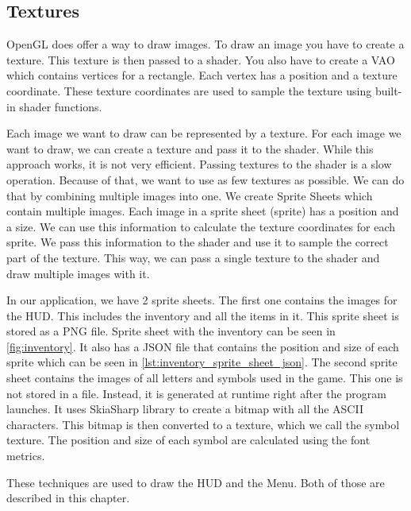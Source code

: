\subsection{Textures} \label{sec:textures}
OpenGL does offer a way to draw images.
To draw an image you have to create a texture.
This texture is then passed to a shader.
You also have to create a VAO which contains vertices for a rectangle.
Each vertex has a position and a texture coordinate.
These texture coordinates are used to sample the texture using built-in shader functions.

Each image we want to draw can be represented by a texture.
For each image we want to draw, we can create a texture and pass it to the shader.
While this approach works, it is not very efficient.
Passing textures to the shader is a slow operation.
Because of that, we want to use as few textures as possible.
We can do that by combining multiple images into one.
We create Sprite Sheets which contain multiple images.
Each image in a sprite sheet (sprite) has a position and a size.
We can use this information to calculate the texture coordinates for each sprite.
We pass this information to the shader and use it to sample the correct part of the texture.
This way, we can pass a single texture to the shader and draw multiple images with it.

In our application, we have 2 sprite sheets.
The first one contains the images for the HUD.
This includes the inventory and all the items in it.
This sprite sheet is stored as a PNG file.
Sprite sheet with the inventory can be seen in \autoref{fig:inventory}.
It also has a JSON file that contains the position and size of each sprite which can be seen in \autoref{lst:inventory_sprite_sheet_json}.
The second sprite sheet contains the images of all letters and symbols used in the game.
This one is not stored in a file.
Instead, it is generated at runtime right after the program launches.
It uses SkiaSharp library to create a bitmap with all the ASCII characters.
This bitmap is then converted to a texture, which we call the symbol texture.
The position and size of each symbol are calculated using the font metrics.

These techniques are used to draw the HUD and the Menu.
Both of those are described in this chapter.

